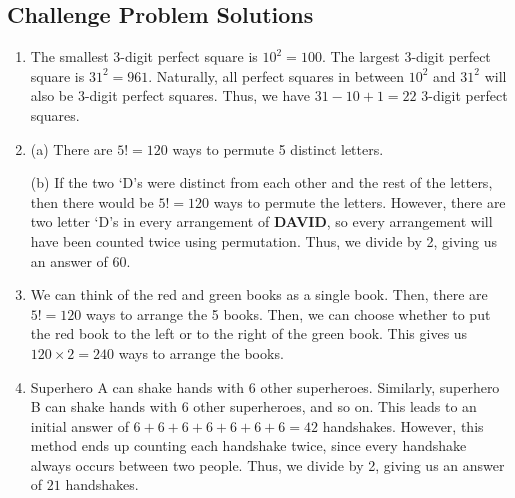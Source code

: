 \documentclass[12pt, letterpaper]{article}
\begin{document}
\newpage
\subsection{Challenge Problem Solutions}

\begin{enumerate}
    \item The smallest 3-digit perfect square is $10^2=100$. The largest 3-digit perfect square is $31^2=961$. Naturally, all perfect squares in between $10^2$ and $31^2$ will also be 3-digit perfect squares. Thus, we have $31-10+1 = \boxed{22}$ 3-digit perfect squares.
    \item (a) There are $5!=\boxed{120}$ ways to permute 5 distinct letters.
    
    (b) If the two `D's were distinct from each other and the rest of the letters, then there would be $5!=120$ ways to permute the letters. However, there are two letter `D's in every arrangement of \textbf{DAVID}, so every arrangement will have been counted twice using permutation. Thus, we divide by 2, giving us an answer of $\boxed{60}$.
    \item We can think of the red and green books as a single book. Then, there are $5!=120$ ways to arrange the 5 books. Then, we can choose whether to put the red book to the left or to the right of the green book. This gives us $120\times2=\boxed{240}$ ways to arrange the books.
    \item Superhero A can shake hands with 6 other superheroes. Similarly, superhero B can shake hands with 6 other superheroes, and so on. This leads to an initial answer of $6+6+6+6+6+6+6=42$ handshakes. However, this method ends up counting each handshake twice, since every handshake always occurs between two people. Thus, we divide by 2, giving us an answer of $\boxed{21}$ handshakes.
\end{enumerate}
\end{document}
